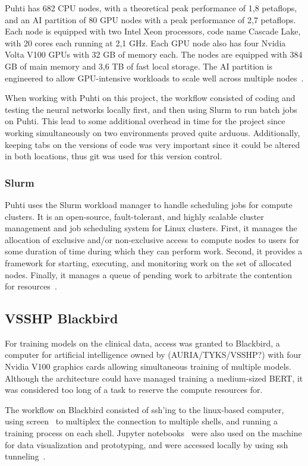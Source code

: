 Puhti has 682 CPU nodes, with a theoretical peak performance of 1,8 petaflops, and an AI partition of 80 GPU nodes with a peak performance of 2,7 petaflops.
Each node is equipped with two Intel Xeon processors, code name Cascade Lake, with 20 cores each running at 2,1 GHz.
Each GPU node also has four Nvidia Volta V100 GPUs with 32 GB of memory each.
The nodes are equipped with 384 GB of main memory and 3,6 TB of fast local storage.
The AI partition is engineered to allow GPU-intensive workloads to scale well across multiple nodes~\cite{zotero-178}.

When working with Puhti on this project, the workflow consisted of coding and testing the neural networks locally first, and then using Slurm to run batch jobs on Puhti.
This lead to some additional overhead in time for the project since working simultaneously on two environments proved quite arduous.
Additionally, keeping tabs on the versions of code was very important since it could be altered in both locations, thus git \cite{zotero-186} was used for this version control.

\subsubsection{Slurm}\label{Slurm}
Puhti uses the Slurm workload manager \cite{zotero-174} to handle scheduling jobs for compute clusters.
It is an open-source, fault-tolerant, and highly scalable cluster management and job scheduling system for Linux clusters.
First, it manages the allocation of exclusive and/or non-exclusive access to compute nodes to users for some duration of time during which they can perform work.
Second, it provides a framework for starting, executing, and monitoring work on the set of allocated nodes.
Finally, it manages a queue of pending work to arbitrate the contention for resources~\cite{zotero-176}.


\subsection{VSSHP Blackbird} \label{VSSHP Blackbird}
For training models on the clinical data, access was granted to Blackbird, a computer for artificial intelligence owned by (AURIA/TYKS/VSSHP?) with four Nvidia V100 graphics cards allowing simultaneous training of multiple models.
Although the architecture could have managed training a medium-sized BERT, it was considered too long of a task to reserve the compute resources for.

The workflow on Blackbird consisted of ssh'ing to the linux-based computer, using screen~\cite{zotero-180} to multiplex the connection to multiple shells, and running a training process on each shell.
Jupyter notebooks~\cite{zotero-182} were also used on the machine for data visualization and prototyping, and were accessed locally by using ssh tunneling~\cite{zotero-184}.

